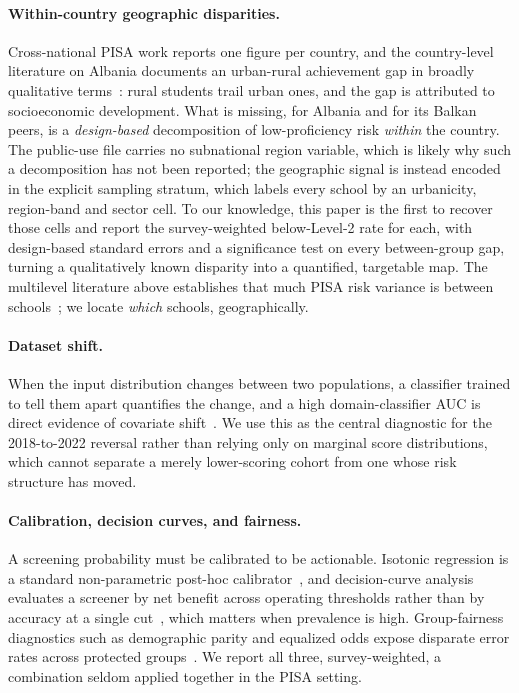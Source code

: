 \paragraph{Within-country geographic disparities.}
Cross-national PISA work reports one figure per country, and the country-level literature
on Albania documents an urban-rural achievement gap in broadly qualitative
terms~\citep{worldbank_albania_education}: rural students trail urban ones, and the gap is
attributed to socioeconomic development. What is missing, for Albania and for its Balkan
peers, is a \emph{design-based} decomposition of low-proficiency risk \emph{within} the
country. The public-use file carries no subnational region variable, which is likely why
such a decomposition has not been reported; the geographic signal is instead encoded in
the explicit sampling stratum, which labels every school by an urbanicity, region-band and
sector cell. To our knowledge, this paper is the first to recover those cells and report
the survey-weighted below-Level-2 rate for each, with design-based standard errors and a
significance test on every between-group gap, turning a qualitatively known disparity into
a quantified, targetable map. The multilevel literature above establishes that much PISA
risk variance is between schools~\citep{masci2018student,goldstein2011multilevel}; we
locate \emph{which} schools, geographically.

\paragraph{Dataset shift.}
When the input distribution changes between two populations, a classifier trained to
tell them apart quantifies the change, and a high domain-classifier AUC is direct
evidence of covariate shift~\citep{quinonero2009dataset}. We use this as the central
diagnostic for the 2018-to-2022 reversal rather than relying only on marginal score
distributions, which cannot separate a merely lower-scoring cohort from one whose risk
structure has moved.

\paragraph{Calibration, decision curves, and fairness.}
A screening probability must be calibrated to be actionable. Isotonic regression is a
standard non-parametric post-hoc calibrator~\citep{zadrozny2002isotonic}, and
decision-curve analysis evaluates a screener by net benefit across operating thresholds
rather than by accuracy at a single cut~\citep{vickers2006dca}, which matters when
prevalence is high. Group-fairness diagnostics such as demographic parity and equalized
odds expose disparate error rates across protected groups~\citep{hardt2016equalized}. We
report all three, survey-weighted, a combination seldom applied together in the PISA
setting.

